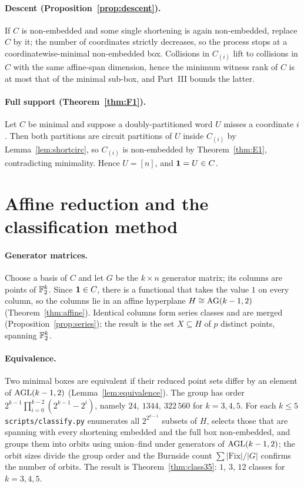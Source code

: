 \paragraph{Descent (Proposition~\ref{prop:descent}).} If $C$ is non-embedded and some single shortening is again non-embedded, replace $C$ by it; the number of coordinates strictly decreases, so the process stops at a coordinatewise-minimal non-embedded box. Collisions in $C_{(i)}$ lift to collisions in $C$ with the same affine-span dimension, hence the minimum witness rank of $C$ is at most that of the minimal sub-box, and Part~III bounds the latter.

\paragraph{Full support (Theorem~\ref{thm:F1}).} Let $C$ be minimal and suppose a doubly-partitioned word $U$ misses a coordinate $i$. Then both partitions are circuit partitions of $U$ inside $C_{(i)}$ by Lemma~\ref{lem:shortcirc}, so $C_{(i)}$ is non-embedded by Theorem~\ref{thm:E1}, contradicting minimality. Hence $U=[n]$, and $\mathbf 1=U\in C$.

\section{Affine reduction and the classification method}\label{app:F}

\paragraph{Generator matrices.} Choose a basis of $C$ and let $G$ be the $k\times n$ generator matrix; its columns are points of $\mathbb F_2^k$. Since $\mathbf 1\in C$, there is a functional that takes the value $1$ on every column, so the columns lie in an affine hyperplane $H\cong\mathrm{AG}(k-1,2)$ (Theorem~\ref{thm:affine}). Identical columns form series classes and are merged (Proposition~\ref{prop:series}); the result is the set $X\subseteq H$ of $p$ distinct points, spanning $\mathbb F_2^k$.

\paragraph{Equivalence.} Two minimal boxes are equivalent if their reduced point sets differ by an element of $\mathrm{AGL}(k-1,2)$ (Lemma~\ref{lem:equivalence}). The group has order $2^{k-1}\prod_{i=0}^{k-2}(2^{k-1}-2^i)$, namely $24,\ 1344,\ 322\,560$ for $k=3,4,5$. For each $k\le5$ \texttt{scripts/classify.py} enumerates all $2^{2^{k-1}}$ subsets of $H$, selects those that are spanning with every shortening embedded and the full box non-embedded, and groups them into orbits using union--find under generators of $\mathrm{AGL}(k-1,2)$; the orbit sizes divide the group order and the Burnside count $\sum|\mathrm{Fix}|/|G|$ confirms the number of orbits. The result is Theorem~\ref{thm:class35}: $1$, $3$, $12$ classes for $k=3,4,5$.


